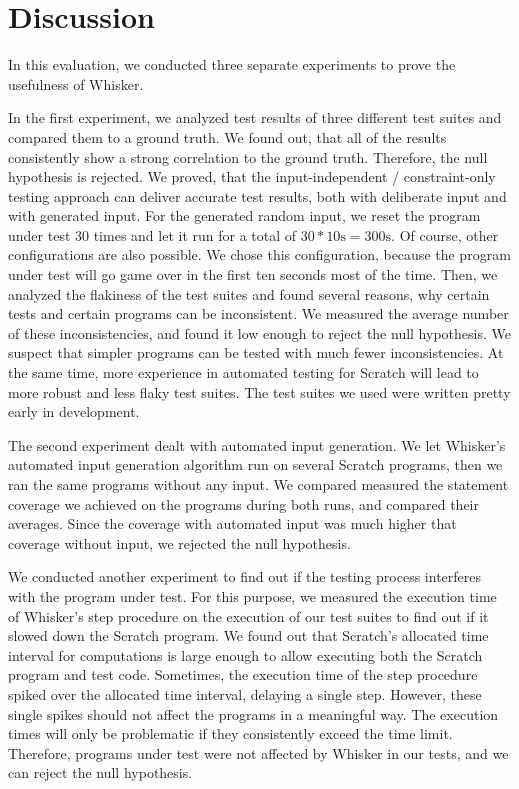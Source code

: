 \section{Discussion}
\label{sec:discussion}

In this evaluation, we conducted three separate experiments to prove the usefulness of Whisker.
\parspace

In the first experiment, we analyzed test results of three different test suites and compared them to a ground truth.
We found out, that all of the results consistently show a strong correlation to the ground truth.
Therefore, the null hypothesis is rejected.
We proved, that the input-independent / constraint-only testing approach can deliver accurate test results,
both with deliberate input and with generated input.
For the generated random input, we reset the program under test 30 times and let it run for a total of $30 * 10\text{s} = 300\text{s}$.
Of course, other configurations are also possible.
We chose this configuration, because the program under test will go game over in the first ten seconds most of the time.
Then, we analyzed the flakiness of the test suites and found several reasons,
why certain tests and certain programs can be inconsistent.
We measured the average number of these inconsistencies,
and found it low enough to reject the null hypothesis.
We suspect that simpler programs can be tested with much fewer inconsistencies.
At the same time, more experience in automated testing for Scratch will lead to more robust and less flaky test suites.
The test suites we used were written pretty early in development.
\parspace

The second experiment dealt with automated input generation.
We let Whisker's automated input generation algorithm run on several Scratch programs,
then we ran the same programs without any input.
We compared measured the statement coverage we achieved on the programs during both runs,
and compared their averages.
Since the coverage with automated input was much higher that coverage without input,
we rejected the null hypothesis.
\parspace

We conducted another experiment to find out
if the testing process interferes with the program under test.
For this purpose, we measured the execution time of Whisker's step procedure on the execution of our test suites
to find out if it slowed down the Scratch program.
We found out that Scratch's allocated time interval for computations is large enough to
allow executing both the Scratch program and test code.
Sometimes, the execution time of the step procedure spiked over the allocated time interval,
delaying a single step.
However, these single spikes should not affect the programs in a meaningful way.
The execution times will only be problematic if they consistently exceed the time limit.
Therefore, programs under test were not affected by Whisker in our tests, and we can reject the null hypothesis.



